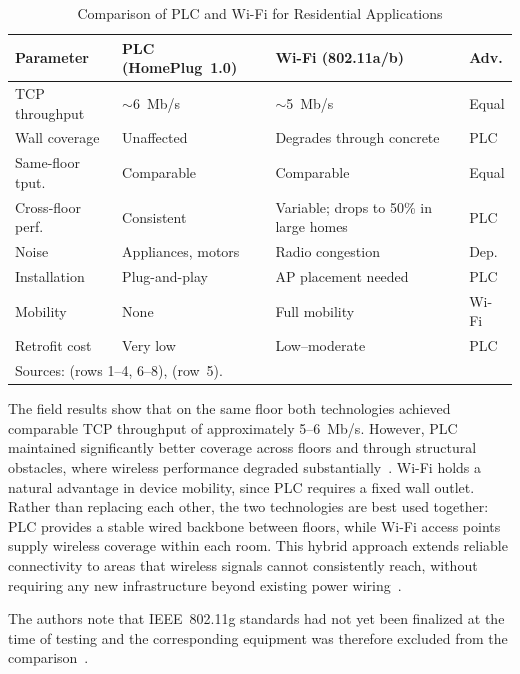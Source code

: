 \begin{table}[H]
  \caption{Comparison of PLC and Wi-Fi for Residential 
  Applications}
  \label{tab:plc_wifi}
  \centering
  \renewcommand{\arraystretch}{1.25}
  \begin{tabular}{p{1.9cm} p{1.8cm} p{1.8cm} p{0.8cm}}
    \hline
    \textbf{Parameter} & \textbf{PLC (HomePlug~1.0)} & 
    \textbf{Wi-Fi (802.11a/b)} & \textbf{Adv.} \\
    \hline
    TCP throughput   & $\sim$6~Mb/s        & $\sim$5~Mb/s 
                     & Equal  \\
    Wall coverage    & Unaffected          & Degrades through 
                                             concrete        
                     & PLC    \\
    Same-floor tput. & Comparable          & Comparable     
                     & Equal  \\
    Cross-floor perf.& Consistent          & Variable; drops 
                                             to 50\% in large 
                                             homes           
                     & PLC    \\
    Noise            & Appliances, motors  & Radio congestion 
                     & Dep.   \\
    Installation     & Plug-and-play       & AP placement 
                                             needed          
                     & PLC    \\
    Mobility         & None                & Full mobility  
                     & Wi-Fi  \\
    Retrofit cost    & Very low            & Low--moderate  
                     & PLC    \\
    \hline
    \multicolumn{4}{l}{%
      \footnotesize Sources: \cite{Lin2003WirelessPLCComparison} 
      (rows 1--4, 6--8), \cite{Zimmermann2002PLCChannelModel} 
      (row~5).} \\
    \hline
  \end{tabular}
\end{table}


The field results show that on the same floor both 
technologies achieved comparable TCP throughput of 
approximately 5--6~Mb/s. However, PLC maintained 
significantly better coverage across floors and through 
structural obstacles, where wireless performance degraded 
substantially~\cite{Lin2003WirelessPLCComparison}. Wi-Fi 
holds a natural advantage in device mobility, since PLC 
requires a fixed wall outlet. Rather than replacing each 
other, the two technologies are best used together: PLC 
provides a stable wired backbone between floors, while 
Wi-Fi access points supply wireless coverage within each 
room. This hybrid approach extends reliable connectivity 
to areas that wireless signals cannot consistently reach, 
without requiring any new infrastructure beyond existing 
power wiring~\cite{Galli2011GridSmartGridApplications}.


The authors note that IEEE~802.11g standards had not 
yet been finalized at the time of testing and the 
corresponding equipment was therefore excluded from 
the comparison~\cite{Lin2003WirelessPLCComparison}.
